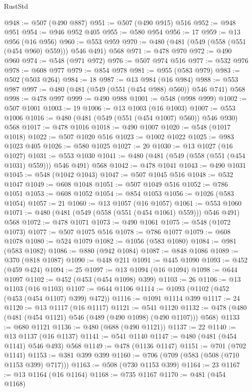 \begin{lexlean}{RustStd}
\begin{coremodule}
@948 := @507 (@490 @887)
@951 := @507 (@490 @915) @516
@952 := @948 @951
@954 := @946 @952 @405
@955 := @580 @954
@956 := 17
@959 := @13 @956 (@16 @956)
@960 := @553 @959
@970 := @480 (@481 (@549 (@558 (@551 (@454 @960) @559))) @546 @491) @568
@971 := @478 @970
@972 := @490 @960
@974 := @548 (@971 @972)
@976 := @507 @974 @516
@977 := @532 @976
@978 := @608 @977
@979 := @854 @978
@981 := @955 (@583 @979)
@983 := @502 (@503 @264)
@984 := 18
@987 := @13 @984 (@16 @984)
@988 := @553 @987
@997 := @480 (@481 (@549 (@551 (@454 @988) @560)) @546 @741) @568
@998 := @478 @997
@999 := @490 @988
@1001 := @548 (@998 @999)
@1002 := @507 @1001
@1003 := 19
@1006 := @13 @1003 (@16 @1003)
@1007 := @553 @1006
@1016 := @480 (@481 (@549 (@551 (@454 @1007) @560)) @546 @930) @568
@1017 := @478 @1016
@1018 := @490 @1007
@1020 := @548 (@1017 @1018)
@1022 := @507 @1020 @516
@1023 := @1002 @1022
@1025 := @983 @1023 @405
@1026 := @580 @1025
@1027 := 20
@1030 := @13 @1027 (@16 @1027)
@1031 := @553 @1030
@1041 := @480 (@481 (@549 (@558 (@551 (@454 @1031) @559))) @546 @491) @568
@1042 := @478 @1041
@1043 := @490 @1031
@1045 := @548 (@1042 @1043)
@1047 := @507 @1045 @516
@1048 := @532 @1047
@1049 := @608 @1048
@1051 := @507 @1049 @516
@1052 := @786 @1051
@1053 := @608 @1052
@1054 := @854 @1053
@1056 := @1026 (@583 @1054)
@1057 := 21
@1060 := @13 @1057 (@16 @1057)
@1061 := @553 @1060
@1071 := @480 (@481 (@549 (@558 (@551 (@454 @1061) @559))) @546 @491) @568
@1072 := @478 @1071
@1073 := @490 @1061
@1075 := @548 (@1072 @1073)
@1077 := @507 @1075 @516
@1078 := @786 @1077
@1079 := @608 @1078
@1080 := @524 @1079
@1082 := @1056 (@583 @1080)
@1084 := @981 (@583 @1082)
@1086 := @880 (@942 @1084)
@1087 := @848 @1086
@1089 := @370 (@818 @1087)
@1090 := @448 @211
@1091 := @445 @1090
@1093 := @452 (@459 @424)
@1094 := 25
@1097 := @13 @1094 (@16 @1094)
@1098 := @644 @1097
@1102 := @452 (@453 (@454 @1098) @399)
@1103 := 26
@1106 := @13 @1103 (@16 @1103)
@1107 := @644 @1106
@1114 := @1093 (@1102 (@452 (@453 (@454 @1107) @399) @472))
@1116 := @1091 @1114 @399
@1117 := 24
@1120 := @13 @1117 (@16 @1117)
@1121 := @541 @1120
@1132 := @478 (@480 (@481 (@454 @1121) @546 (@489 (@490 @1098) (@490 @1107))) @568)
@1133 := @680 @1121
@1136 := @480 (@688 (@490 @1121))
@1137 := 22
@1140 := @13 @1137 (@16 @1137)
@1141 := @541 @1140
@1147 := @480 (@481 (@454 @1141) @546 @493) @568
@1149 := @478 (@1136 @1147)
@1151 := @701 (@702 @1141)
@1153 := @381 @399 @399
@1160 := @706 (@709 (@583 (@508 (@710 @1153 @399) @717)))
@1163 := @508 (@730 @1153 @399)
@1164 := 23
@1167 := @13 @1164 (@16 @1164)
@1168 := @735 @1167
@1170 := @481 (@454 @1168)

\end{coremodule}
\end{lexlean}
